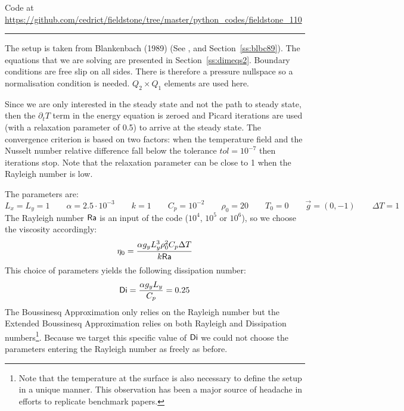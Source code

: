 

\begin{center}
Code at \url{https://github.com/cedrict/fieldstone/tree/master/python_codes/fieldstone_110}
\end{center}

\par\noindent\rule{\textwidth}{0.4pt}



The setup is taken from Blankenbach \etal (1989) \cite{blbc89} (See , and Section~\ref{ss:blbc89}). 
The equations that we are solving are presented in Section~\ref{ss:dimeqs2}. 
Boundary conditions are free slip on all sides. There is therefore a pressure nullspace
so a normalisation condition is needed.
$Q_2\times Q_1$ elements are used here. 

Since we are only interested in the steady state and not the path to steady state, 
then the $\partial_t T$ term in the energy equation is zeroed and Picard iterations
are used (with a relaxation parameter of 0.5) to arrive at the steady state.
The convergence criterion is based on two factors: when the temperature field and the Nusselt number 
relative difference fall below the tolerance $tol=10^{-7}$ then iterations stop.
Note that the relaxation parameter can be close to 1 when the Rayleigh number is low.

The parameters are:
\[
L_x=L_y=1
\qquad
\alpha=2.5\cdot 10^{-3}
\qquad
k=1
\qquad
C_p=10^{-2}
\qquad
\rho_0=20
\qquad
T_0=0
\qquad
\vec{g}=(0,-1)
\qquad
\Delta T = 1
\]
The Rayleigh number ${\mathsf{Ra}}$ is an input of the code ($10^4$, $10^5$ or $10^6$), so 
we choose the viscosity accordingly:
\[
\eta_0 = \frac{\alpha g_y L_y^3 \rho_0^2 C_p \Delta T}{k {\mathsf{Ra}}}
\]
This choice of parameters yields the following dissipation number:
\[
{\mathsf{Di}}=\frac{\alpha g_y L_y}{C_p} = 0.25
\]
The Boussinesq Approximation only relies on the Rayleigh number but the 
Extended Boussinesq Approximation relies on both Rayleigh and Dissipation numbers\footnote{Note that 
the temperature at the surface is also necessary to define the setup in a unique manner. This observation
has been a major source of headache in efforts to replicate benchmark papers.}. 
Because we target this specific value of ${\mathsf{Di}}$ we could not choose the 
parameters entering the Rayleigh number as freely as before.


